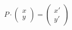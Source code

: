 \documentclass[preview]{standalone}
\begin{document}
\begin{align*}
P \cdot \begin{pmatrix} x \\ y \end{pmatrix} = \begin{pmatrix} x' \\ y' \end{pmatrix}
\end{align*}
\end{document}
